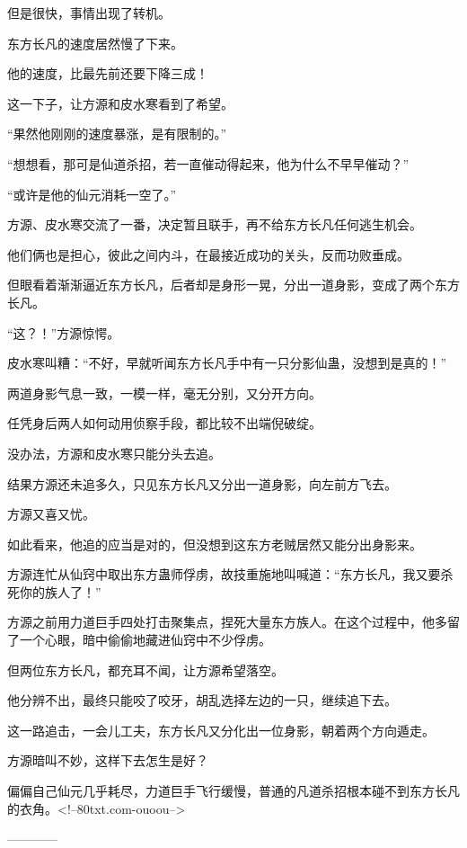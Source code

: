 \begin{this_body}
但是很快，事情出现了转机。

东方长凡的速度居然慢了下来。

他的速度，比最先前还要下降三成！

这一下子，让方源和皮水寒看到了希望。

“果然他刚刚的速度暴涨，是有限制的。”

“想想看，那可是仙道杀招，若一直催动得起来，他为什么不早早催动？”

“或许是他的仙元消耗一空了。”

方源、皮水寒交流了一番，决定暂且联手，再不给东方长凡任何逃生机会。

他们俩也是担心，彼此之间内斗，在最接近成功的关头，反而功败垂成。

但眼看着渐渐逼近东方长凡，后者却是身形一晃，分出一道身影，变成了两个东方长凡。

“这？！”方源惊愕。

皮水寒叫糟：“不好，早就听闻东方长凡手中有一只分影仙蛊，没想到是真的！”

两道身影气息一致，一模一样，毫无分别，又分开方向。

任凭身后两人如何动用侦察手段，都比较不出端倪破绽。

没办法，方源和皮水寒只能分头去追。

结果方源还未追多久，只见东方长凡又分出一道身影，向左前方飞去。

方源又喜又忧。

如此看来，他追的应当是对的，但没想到这东方老贼居然又能分出身影来。

方源连忙从仙窍中取出东方蛊师俘虏，故技重施地叫喊道：“东方长凡，我又要杀死你的族人了！”

方源之前用力道巨手四处打击聚集点，捏死大量东方族人。在这个过程中，他多留了一个心眼，暗中偷偷地藏进仙窍中不少俘虏。

但两位东方长凡，都充耳不闻，让方源希望落空。

他分辨不出，最终只能咬了咬牙，胡乱选择左边的一只，继续追下去。

这一路追击，一会儿工夫，东方长凡又分化出一位身影，朝着两个方向遁走。

方源暗叫不妙，这样下去怎生是好？

偏偏自己仙元几乎耗尽，力道巨手飞行缓慢，普通的凡道杀招根本碰不到东方长凡的衣角。<!--80txt.com-ouoou-->

------------

\end{this_body}

